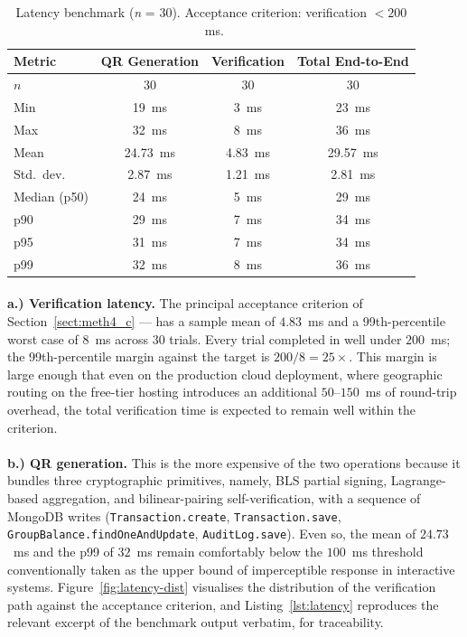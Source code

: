 \begin{table}[H]
  \centering
  \caption{Latency benchmark (\textit{n} = 30). Acceptance criterion: verification $< 200$~ms.}
  \label{tab:latency}
  \begin{tabular}{|l|c|c|c|}
    \hline
    Metric & QR Generation & Verification & Total End-to-End \\\hline
    $n$ & 30 & 30 & 30 \\\hline
    Min & 19~ms & 3~ms & 23~ms \\\hline
    Max & 32~ms & 8~ms & 36~ms \\\hline
    Mean & 24.73~ms & 4.83~ms & 29.57~ms \\\hline
    Std.\ dev. & 2.87~ms & 1.21~ms & 2.81~ms \\\hline
    Median (p50) & 24~ms & 5~ms & 29~ms \\\hline
    p90 & 29~ms & 7~ms & 34~ms \\\hline
    p95 & 31~ms & 7~ms & 34~ms \\\hline
    p99 & 32~ms & 8~ms & 36~ms \\\hline
  \end{tabular}
\end{table}

\paragraph{}\textbf{a.) Verification latency.} The principal acceptance criterion of Section~\ref{sect:meth4_c} --- has a sample mean of $4.83$~ms and a 99th-percentile worst case of $8$~ms across 30 trials. Every trial completed in well under $200$~ms; the 99th-percentile margin against the target is $200 / 8 = 25\times$. This margin is large enough that even on the production cloud deployment, where geographic routing on the free-tier hosting introduces an additional $50$--$150$~ms of round-trip overhead, the total verification time is expected to remain well within the criterion.

\paragraph{}\textbf{b.) QR generation.} This is the more expensive of the two operations because it bundles three cryptographic primitives, namely, BLS partial signing, Lagrange-based aggregation, and bilinear-pairing self-verification, with a sequence of MongoDB writes (\texttt{Transaction.create}, \texttt{Transaction.save}, \texttt{GroupBalance.findOneAndUpdate}, \texttt{AuditLog.save}). Even so, the mean of $24.73$~ms and the p99 of $32$~ms remain comfortably below the $100$~ms threshold conventionally taken as the upper bound of imperceptible response in interactive systems. Figure~\ref{fig:latency-dist} visualises the distribution of the verification path against the acceptance criterion, and Listing~\ref{lst:latency} reproduces the relevant excerpt of the benchmark output verbatim, for traceability.

